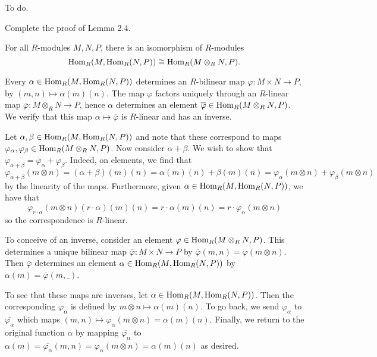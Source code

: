 \documentclass[../../master.tex]{subfiles}
\begin{document}
\begin{solution}
    To do.
\end{solution}

\begin{problem}
    Complete the proof of Lemma 2.4.
    \begin{proposition}[Lemma 2.4] 
        For all $R$-modules $M, N, P$, there is an isomorphism of $R$-modules
        \[
            \operatorname{Hom}_R(M, \operatorname{Hom}_R(N, P)) \cong \operatorname{Hom}_R(M \otimes_R N, P).
        \]
    \end{proposition}
\end{problem}

\begin{solution}
    Every $\alpha \in \operatorname{Hom}_R(M, \operatorname{Hom}_R(N, P))$ determines an $R$-bilinear map $\varphi : M \times N \to P$, by $(m, n) \mapsto \alpha(m)(n)$.
    The map $\varphi$ factors uniquely through an $R$-linear map $\overline{\varphi} : M \otimes_R N \to P$, hence $\alpha$ determines an element $\overline{\varphi} \in \operatorname{Hom}_R(M \otimes_R N, P)$.
    We verify that this map $\alpha \mapsto \overline{\varphi}$ is $R$-linear and has an inverse.

    Let $\alpha, \beta \in \operatorname{Hom}_R(M, \operatorname{Hom}_R(N, P))$ and note that these correspond to maps $\varphi_\alpha, \varphi_\beta \in \operatorname{Hom}_R(M \otimes_R N, P)$.
    Now consider $\alpha + \beta$.
    We wish to show that $\varphi_{\alpha + \beta} = \varphi_\alpha + \varphi_\beta$.
    Indeed, on elements, we find that
    \[
        \varphi_{\alpha + \beta}(m \otimes n) = (\alpha + \beta)(m)(n) = \alpha(m)(n) + \beta(m)(n) = \varphi_\alpha(m \otimes n) + \varphi_\beta(m \otimes n)
    \]
    by the linearity of the maps.
    Furthermore, given $\alpha \in \operatorname{Hom}_R(M, \operatorname{Hom}_R(N, P))$, we have that
    \[
        \varphi_{r \cdot \alpha}(m \otimes n) (r \cdot \alpha)(m)(n) = r \cdot \alpha(m)(n) = r \cdot \varphi_\alpha (m \otimes n)
    \]
    so the correspondence is $R$-linear.
    
    To conceive of an inverse, consider an element $\varphi \in \operatorname{Hom}_R(M \otimes_R N, P)$.
    This determines a unique bilinear map $\overline{\varphi} : M \times N \to P$ by $\overline{\varphi}(m, n) = \varphi(m \otimes n)$.
    Then $\overline{\varphi}$ determines an element $\alpha \in \operatorname{Hom}_R(M, \operatorname{Hom}_R(N, P))$ by $\alpha(m) = \overline{\varphi}(m, \_)$.

    To see that these maps are inverses, let $\alpha \in \operatorname{Hom}_R(M, \operatorname{Hom}_R(N, P))$.
    Then the corresponding $\varphi_\alpha$ is defined by $m \otimes n \mapsto \alpha(m)(n)$.
    To go back, we send $\varphi_{\alpha}$ to $\overline{\varphi_\alpha}$ which maps $(m, n) \mapsto \varphi_\alpha(m \otimes n) = \alpha(m)(n)$.
    Finally, we return to the original function $\alpha$ by mapping $\overline{\varphi_\alpha}$ to $\alpha(m) = \overline{\varphi_\alpha}(m, n) = \varphi_\alpha(m \otimes n) = \alpha(m)(n)$ as desired.
\end{solution}
\end{document}
